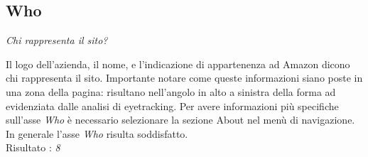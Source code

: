 \subsection{Who}\label{who}
\begin{center}

\textit{Chi rappresenta il sito?}


\end{center}
\begin{flushleft}
Il logo dell'azienda, il nome, e l'indicazione di appartenenza ad Amazon 
dicono chi rappresenta il sito. Importante notare come queste 
informazioni siano poste in una zona  della pagina: risultano 
nell'angolo in alto a sinistra della forma ad  evidenziata 
dalle analisi di eyetracking. Per avere informazioni più specifiche sull'asse \textit{Who}
è necessario selezionare la sezione About nel menù di navigazione. \\
In generale l'asse \textit{Who} risulta soddisfatto. \\
Risultato : \textit{8}
\end{flushleft}
